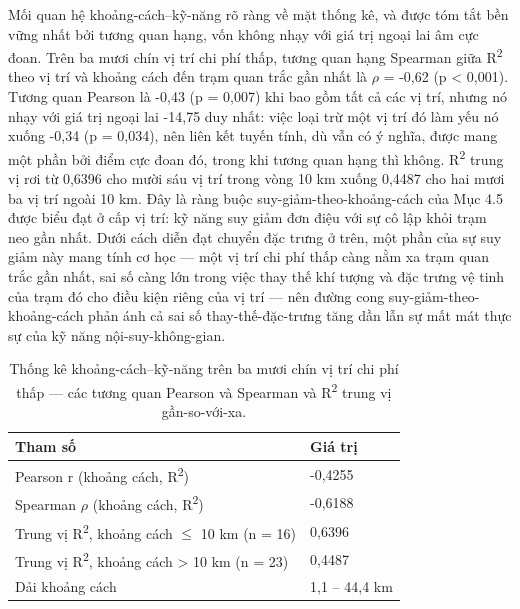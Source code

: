 Mối quan hệ khoảng-cách--kỹ-năng rõ ràng về mặt thống kê, và được tóm tắt bền vững nhất bởi tương quan hạng, vốn không nhạy với giá trị ngoại lai âm cực đoan. Trên ba mươi chín vị trí chi phí thấp, tương quan hạng Spearman giữa R\textsuperscript{2} theo vị trí và khoảng cách đến trạm quan trắc gần nhất là $\rho$ = -0,62 (p < 0,001). Tương quan Pearson là -0,43 (p = 0,007) khi bao gồm tất cả các vị trí, nhưng nó nhạy với giá trị ngoại lai -14,75 duy nhất: việc loại trừ một vị trí đó làm yếu nó xuống -0,34 (p = 0,034), nên liên kết tuyến tính, dù vẫn có ý nghĩa, được mang một phần bởi điểm cực đoan đó, trong khi tương quan hạng thì không. R\textsuperscript{2} trung vị rơi từ 0,6396 cho mười sáu vị trí trong vòng 10 km xuống 0,4487 cho hai mươi ba vị trí ngoài 10 km. Đây là ràng buộc suy-giảm-theo-khoảng-cách của Mục 4.5 được biểu đạt ở cấp vị trí: kỹ năng suy giảm đơn điệu với sự cô lập khỏi trạm neo gần nhất. Dưới cách diễn đạt chuyển đặc trưng ở trên, một phần của sự suy giảm này mang tính cơ học --- một vị trí chi phí thấp càng nằm xa trạm quan trắc gần nhất, sai số càng lớn trong việc thay thế khí tượng và đặc trưng vệ tinh của trạm đó cho điều kiện riêng của vị trí --- nên đường cong suy-giảm-theo-khoảng-cách phản ánh cả sai số thay-thế-đặc-trưng tăng dần lẫn sự mất mát thực sự của kỹ năng nội-suy-không-gian.

{\small
\begin{longtable}{ll}
\caption{Thống kê khoảng-cách--kỹ-năng trên ba mươi chín vị trí chi phí thấp --- các tương quan Pearson và Spearman và R\textsuperscript{2} trung vị gần-so-với-xa.}\\
\toprule
\textbf{Tham số} & \textbf{Giá trị} \\
\midrule\endhead
Pearson r (khoảng cách, R\textsuperscript{2}) & -0,4255 \\
Spearman $\rho$ (khoảng cách, R\textsuperscript{2}) & -0,6188 \\
Trung vị R\textsuperscript{2}, khoảng cách $\leq$ 10 km (n = 16) & 0,6396 \\
Trung vị R\textsuperscript{2}, khoảng cách > 10 km (n = 23) & 0,4487 \\
Dải khoảng cách & 1,1 -- 44,4 km \\
\bottomrule
\end{longtable}
}


